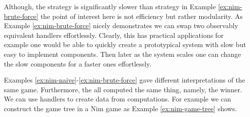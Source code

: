 Although, the  strategy is significantly slower than  strategy in Example \ref{ex:nim-brute-force} the point of interest here is not efficiency but rather modularity. As Example \ref{ex:nim-brute-force} nicely demonstrates we can swap two observably equivalent handlers effortlessly. Clearly, this has practical applications for example one would be able to quickly create a prototypical system with slow but easy to implement components. Then later as the system scales one can change the slow components for a faster ones effortlessly.

Examples \ref{ex:nim-naive}-\ref{ex:nim-brute-force} gave different interpretations of the same game. Furthermore, the all computed the same thing, namely, the winner. We can use handlers to create data from computations. For example we can construct the game tree in a Nim game as Example \ref{ex:nim-game-tree} shows. 


